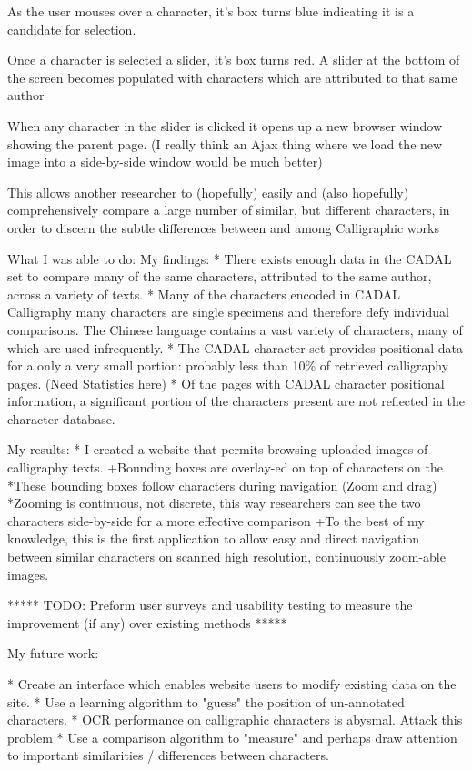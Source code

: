                 As the user mouses over a character, it's box turns blue indicating it is a candidate for selection.
                
                Once a character is selected a slider, it's box turns red. A slider at the bottom of the screen becomes populated with characters which are attributed to that same author
                
                When any character in the slider is clicked it opens up a new browser window showing the parent page.  (I really think an Ajax thing where we load the new image into a side-by-side window would be much better)
                
                This allows another researcher to (hopefully) easily and (also hopefully) comprehensively compare a large number of similar, but different characters, in order to discern the subtle differences between and among Calligraphic works
                

What I was able to do:
    My findings:
        * There exists enough data in the CADAL set to compare many of the same characters, attributed to the same author, across a variety of texts.
        *  Many of the characters encoded in CADAL Calligraphy many characters are single specimens and therefore defy individual comparisons.  The Chinese language contains a vast variety of characters, many of which are used infrequently.
        *  The CADAL character set provides positional data for a only a very small portion: probably less than 10\% of retrieved calligraphy pages.  (Need Statistics here)
        *  Of the pages with CADAL character positional information, a significant portion of the characters present are not reflected in the character database.
    
    My results:
        *  I created a website that permits browsing uploaded images of calligraphy texts.
            +Bounding boxes are overlay-ed on top of characters on the 
                *These bounding boxes follow characters during navigation (Zoom and drag)
                *Zooming is continuous, not discrete, this way researchers can see the two characters side-by-side for a more effective comparison
            +To the best of my knowledge, this is the first application to allow easy and direct navigation between similar characters on scanned high resolution, continuously zoom-able images.

        ***** TODO: Preform user surveys and usability testing to measure the improvement (if any) over existing methods *****

    My future work:
        
        *  Create an interface which enables website users to modify existing data on the site.
        *  Use a learning algorithm to "guess" the position of un-annotated characters.
        *  OCR performance on calligraphic characters is abysmal.  Attack this problem
        *  Use a comparison algorithm to "measure" and perhaps draw attention to important similarities / differences between characters.




